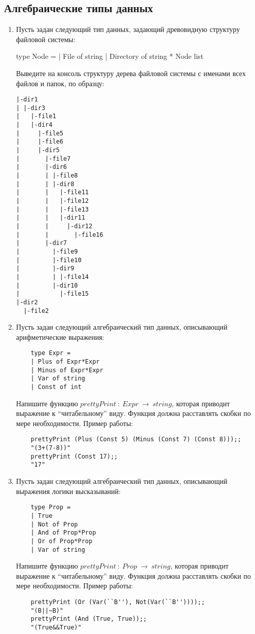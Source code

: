 \documentclass[a4paper,11pt]{article}
\newcommand{\<}{\langle}
\renewcommand{\>}{\rangle}
\begin{document}
\subsection*{Алгебраические типы данных}
\begin{enumerate}
\item Пусть задан следующий тип данных, задающий древовидную структуру файловой системы:
  \begin{fsharp}
    type Node =
    | File of string
    | Directory of string * Node list
  \end{fsharp}
  Выведите на консоль структуру дерева файловой системы с именами всех файлов и папок, по образцу:
  \begin{lstlisting}[language={}, basicstyle=\ttfamily\scriptsize]
|-dir1
| |-dir3
|   |-file1
|   |-dir4
|     |-file5
|     |-file6
|     |-dir5
|       |-file7
|       |-dir6
|       | |-file8
|       | |-dir8
|       |   |-file11
|       |   |-file12
|       |   |-file13
|       |   |-dir11
|       |     |-dir12
|       |       |-file16
|       |-dir7
|         |-file9
|         |-file10
|         |-dir9
|         | |-file14
|         |-dir10
|           |-file15
|-dir2
  |-file2
  \end{lstlisting}

\item Пусть задан следующий алгебраический тип данных, описывающий
  арифметические выражения:
  \begin{lstlisting}
    type Expr = 
    | Plus of Expr*Expr
    | Minus of Expr*Expr
    | Var of string
    | Const of int
  \end{lstlisting}
  Напишите функцию $prettyPrint~:~Expr~\rightarrow~string$, которая приводит 
  выражение к ``читабельному'' виду. Функция должна расставлять скобки по мере
  необходимости. Пример работы:
  \begin{lstlisting}
    prettyPrint (Plus (Const 5) (Minus (Const 7) (Const 8)));;
    "(3+(7-8))"
    prettyPrint (Const 17);;
    "17"
  \end{lstlisting}

\item Пусть задан следующий алгебраический тип данных, описывающий выражения 
  логики высказываний:
  \begin{lstlisting}
    type Prop =
    | True
    | Not of Prop
    | And of Prop*Prop
    | Or of Prop*Prop
    | Var of string
  \end{lstlisting}
  Напишите функцию $prettyPrint~:~Prop~\rightarrow~string$, которая приводит 
  выражение к ``читабельному'' виду. Функция должна расставлять скобки по мере
  необходимости. Пример работы:
  \begin{lstlisting}
    prettyPrint (Or (Var(``B''), Not(Var(``B''))));;
    "(B||~B)"
    prettyPrint (And (True, True));;
    "(True&&True)"
  \end{lstlisting}


\end{enumerate}
\end{document}
